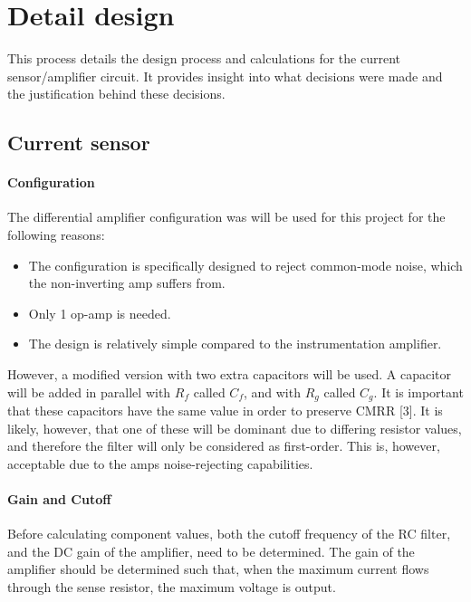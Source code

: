 \chapter{Detail design}\label{ch:detail_design}
This process details the design process and calculations for the current sensor/amplifier circuit. It provides insight into
what decisions were made and the justification behind these decisions.

\section{Current sensor}\label{sec:current_sensor_design}
\subsubsection{Configuration}\label{sec:current_sensor_config}

The differential amplifier configuration was will be used for this project for the following reasons:
\begin{itemize}
  \item The configuration is specifically designed to reject common-mode noise, which the non-inverting amp suffers from.
  \item Only 1 op-amp is needed.
  \item The design is relatively simple compared to the instrumentation amplifier.
\end{itemize}

However, a modified version with two extra capacitors will be used. A capacitor will be added in parallel with $R_f$ called $C_f$, and with $R_g$ called $C_g$. It is important that these capacitors have the same
value in order to preserve CMRR [3]. It is likely, however, that one of these will be dominant due to differing resistor values, and therefore the filter will only be considered as first-order.
This is, however, acceptable due to the amps noise-rejecting capabilities.

\subsubsection{Gain and Cutoff}\label{sec:current_sensor_circuit}
Before calculating component values, both the cutoff frequency of the RC filter, and the DC gain of the amplifier, need to be determined. The gain of the amplifier should be determined
such that, when the maximum current flows through the sense resistor, the maximum voltage is output.

